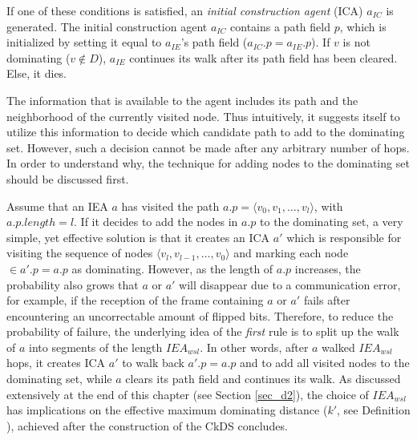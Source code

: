 If one of these conditions is satisfied, an \emph{initial construction agent} (ICA) $a_{IC}$ is generated. The initial construction agent $a_{IC}$ contains a path field $p$, which is initialized by setting it equal to $a_{IE}$'s path field ($a_{IC}.p=a_{IE}.p$). If $v$ is not dominating ($v\notin D$), $a_{IE}$ continues its walk after its path field has been cleared. Else, it dies.

The information that is available to the agent includes its path and the neighborhood of the currently visited node. Thus intuitively, it suggests itself to utilize this information to decide which candidate path to add to the dominating set. However, such a decision cannot be made after any arbitrary number of hops. In order to understand why, the technique for adding nodes to the dominating set should be discussed first.

Assume that an IEA $a$ has visited the path $a.p=\langle v_0, v_1, \ldots, v_l\rangle$, with $a.p.length=l$. If it decides to add the nodes in $a.p$ to the dominating set, a very simple, yet effective solution is that it creates an ICA $a'$ which is responsible for visiting the sequence of nodes $\langle v_l, v_{l-1}, \ldots, v_0\rangle$ and marking each node $\in a'.p=a.p$ as dominating. However, as the length of $a.p$ increases, the probability also grows that $a$ or $a'$ will disappear due to a communication error, for example, if the reception of the frame containing $a$ or $a'$ fails after encountering an uncorrectable amount of flipped bits. Therefore, to reduce the probability of failure, the underlying idea of the \emph{first} rule is to split up the walk of $a$ into segments of the length $IEA_{wsl}$. In other words, after $a$ walked $IEA_{wsl}$ hops, it creates ICA $a'$ to walk back $a'.p=a.p$ and to add all visited nodes to the dominating set, while $a$ clears its path field and continues its walk. As discussed extensively at the end of this chapter (see Section \ref{sec_d2}), the choice of $IEA_{wsl}$ has implications on the effective maximum dominating distance ($k'$, see Definition ), achieved after the construction of the CkDS concludes.


